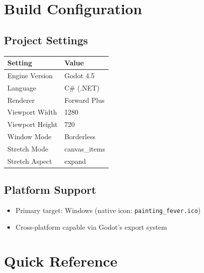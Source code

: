 \documentclass{report}
\begin{document}
\chapter{Build Configuration}
\section{Project Settings}
\begin{longtable}{|l|l|}
	\hline
	\textbf{Setting} & \textbf{Value} \\
	\hline
	Engine Version   & Godot 4.5      \\
	\hline
	Language         & C\# (.NET)     \\
	\hline
	Renderer         & Forward Plus   \\
	\hline
	Viewport Width   & 1280           \\
	\hline
	Viewport Height  & 720            \\
	\hline
	Window Mode      & Borderless     \\
	\hline
	Stretch Mode     & canvas\_items  \\
	\hline
	Stretch Aspect   & expand         \\
	\hline
\end{longtable}

\section{Platform Support}
\begin{itemize}[noitemsep]
	\item Primary target: Windows (native icon: \texttt{painting\_fever.ico})
	\item Cross-platform capable via Godot's export system
\end{itemize}

\appendix
\chapter{Quick Reference}
\end{document}
